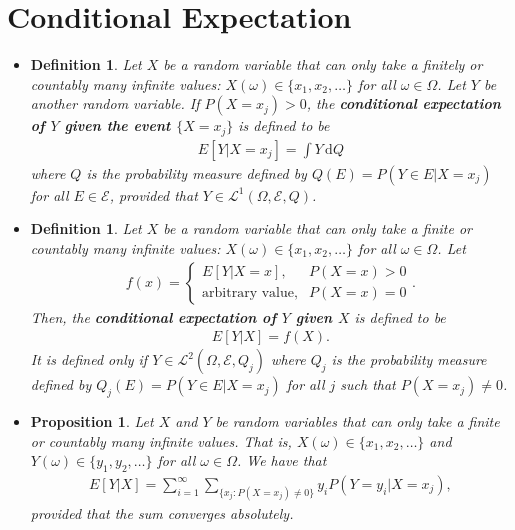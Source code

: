 \documentclass[10pt]{article}
\newtheorem{definition}[lemma]{Definition}
\newtheorem{proposition}[lemma]{Proposition}
\numberwithin{lemma}{section}
\newcommand{\dee}{\mathrm{d}}
\newcommand{\mcal}[1]{\mathcal{#1}}
\begin{document}
\section{Conditional Expectation}

\begin{itemize}
  \item \begin{definition}
    Let $X$ be a random variable that can only take a finitely or countably many infinite values: $X(\omega) \in \{ x_1, x_2, \dotsc \}$ for all $\omega \in \Omega$. Let $Y$ be another random variable. If $P(X = x_j) > 0$, the {\bf conditional expectation of $Y$ given the event $\{ X = x_j\}$} is defined
    to be
    \begin{align*}
      E[Y | X = x_j] = \int Y\, \dee Q
    \end{align*}
    where $Q$ is the probability measure defined by $Q(E) = P(Y \in E | X = x_j)$ for all $E \in \mcal{E}$, provided that $Y \in \mcal{L}^1(\Omega, \mcal{E}, Q)$.
  \end{definition}

  \item \begin{definition}
    Let $X$ be a random variable that can only take a finite or countably many infinite values: $X(\omega) \in \{ x_1, x_2, \dotsc \}$ for all $\omega \in \Omega$. Let
    \begin{align*}
      f(x) = \begin{cases}
        E[Y|X=x], & P(X = x) > 0 \\
        \mbox{arbitrary value}, & P(X = x) = 0
      \end{cases}.
    \end{align*}
    Then, the {\bf conditional expectation of $Y$ given $X$} is defined to be
    \begin{align*}
      E[Y|X] = f(X).
    \end{align*}
    It is defined only if $Y \in \mcal{L}^2(\Omega, \mcal{E}, Q_j)$ where $Q_j$ is the probability measure defined by $Q_j(E) = P(Y \in E | X = x_j)$ for all $j$ such that $P(X = x_j) \neq 0$.
  \end{definition}

  \item \begin{proposition}
    Let $X$ and $Y$ be random variables that can only take a finite or countably many infinite values. That is, $X(\omega) \in \{ x_1, x_2, \dotsc \}$ and $Y(\omega) \in \{ y_1, y_2, \dotsc \}$ for all $\omega \in \Omega$. We have that
    \begin{align*}
      E[Y|X] = \sum_{i=1}^\infty \sum_{\{ x_j : P(X = x_j) \neq 0 \}} y_i P(Y=y_i | X = x_j),
    \end{align*}
    provided that the sum converges absolutely.
  \end{proposition}


\end{itemize}
\end{document}
